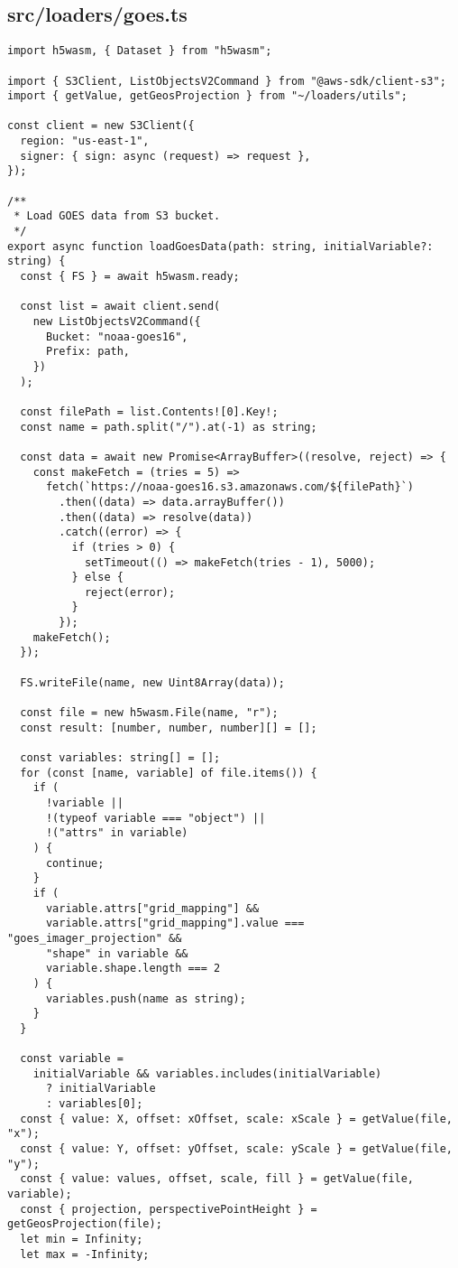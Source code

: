 \subsection{src/loaders/goes.ts}
\begin{verbatim}
import h5wasm, { Dataset } from "h5wasm";

import { S3Client, ListObjectsV2Command } from "@aws-sdk/client-s3";
import { getValue, getGeosProjection } from "~/loaders/utils";

const client = new S3Client({
  region: "us-east-1",
  signer: { sign: async (request) => request },
});

/**
 * Load GOES data from S3 bucket.
 */
export async function loadGoesData(path: string, initialVariable?: string) {
  const { FS } = await h5wasm.ready;

  const list = await client.send(
    new ListObjectsV2Command({
      Bucket: "noaa-goes16",
      Prefix: path,
    })
  );

  const filePath = list.Contents![0].Key!;
  const name = path.split("/").at(-1) as string;

  const data = await new Promise<ArrayBuffer>((resolve, reject) => {
    const makeFetch = (tries = 5) =>
      fetch(`https://noaa-goes16.s3.amazonaws.com/${filePath}`)
        .then((data) => data.arrayBuffer())
        .then((data) => resolve(data))
        .catch((error) => {
          if (tries > 0) {
            setTimeout(() => makeFetch(tries - 1), 5000);
          } else {
            reject(error);
          }
        });
    makeFetch();
  });

  FS.writeFile(name, new Uint8Array(data));

  const file = new h5wasm.File(name, "r");
  const result: [number, number, number][] = [];

  const variables: string[] = [];
  for (const [name, variable] of file.items()) {
    if (
      !variable ||
      !(typeof variable === "object") ||
      !("attrs" in variable)
    ) {
      continue;
    }
    if (
      variable.attrs["grid_mapping"] &&
      variable.attrs["grid_mapping"].value === "goes_imager_projection" &&
      "shape" in variable &&
      variable.shape.length === 2
    ) {
      variables.push(name as string);
    }
  }

  const variable =
    initialVariable && variables.includes(initialVariable)
      ? initialVariable
      : variables[0];
  const { value: X, offset: xOffset, scale: xScale } = getValue(file, "x");
  const { value: Y, offset: yOffset, scale: yScale } = getValue(file, "y");
  const { value: values, offset, scale, fill } = getValue(file, variable);
  const { projection, perspectivePointHeight } = getGeosProjection(file);
  let min = Infinity;
  let max = -Infinity;


\end{verbatim}
